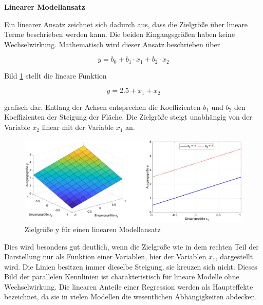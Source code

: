 {\selectfont
\noindent\textbf{Linearer Modellansatz}} \smallskip

\noindent Ein linearer Ansatz zeichnet sich dadurch aus, dass die Zielgr\"{o}{\ss}e \"{u}ber lineare Terme beschrieben werden kann. Die beiden Eingangsgr\"{o}{\ss}en haben keine Wechselwirkung. Mathematisch wird dieser Ansatz beschrieben \"{u}ber

\begin{equation}\label{eq:thirteentwenty}
y=b_{0} +b_{1} \cdot x_{1} +b_{2} \cdot x_{2}
\end{equation}

\noindent Bild \ref{fig:Funktionsansatz} stellt die lineare Funktion 

\begin{equation}\label{eq:thirteentwentyone}
y=2.5+x_{1} +x_{2}
\end{equation}

\noindent grafisch dar. Entlang der Achsen entsprechen die Koeffizienten $b_{1}$ und $b_{2}$ den Koeffizienten der Steigung der Fl\"{a}che. Die Zielgr\"{o}{\ss}e steigt unabh\"{a}ngig von der Variable $x_{2}$ linear mit der Variable $x_{1}$ an.

\noindent 
\begin{figure}[H]
  \centerline{\includegraphics[width=1\textwidth]{Kapitel13/Bilder/image2}}
  \caption{Zielgr\"{o}{\ss}e y f\"{u}r einen linearen Modellansatz}
  \label{fig:Funktionsansatz}
\end{figure}

\noindent Dies wird besonders gut deutlich, wenn die Zielgr\"{o}{\ss}e wie in dem rechten Teil der Darstellung nur als Funktion einer Variablen, hier der Variablen $x_{1}$, dargestellt wird. Die Linien besitzen immer dieselbe Steigung, sie kreuzen sich nicht. Dieses Bild der parallelen Kennlinien ist charakteristisch f\"{u}r lineare Modelle ohne Wechselwirkung. Die linearen Anteile einer Regression werden als Haupteffekte bezeichnet, da sie in vielen Modellen die wesentlichen Abh\"{a}ngigkeiten abdecken.

